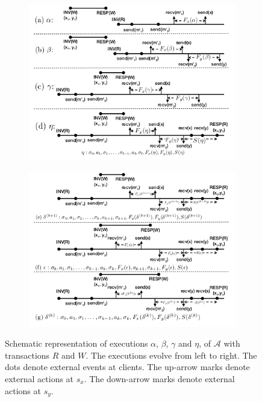 \begin{figure}[t]
	\hspace*{-0.7cm}
	\begin{subfigure}{0.49\textwidth}
		\centering
	\includegraphics[width=1.2\linewidth]{figures/fig4.png}
	\end{subfigure}
	\hspace*{0.0m}  
	\begin{subfigure}{0.49\textwidth}
		\centering
	\includegraphics[width=1.2\linewidth]{figures/fig5.png}
	\end{subfigure} 
	         \caption{
	         	\small{Schematic representation of executions $\alpha$, $\beta$, $\gamma$ and $\eta$,
	         		of ${\mathcal A}$ with transactions $R$ and $W$. The executions evolve from left to right. 
	         		The dots denote external events at clients. 
	         		The up-arrow marks denote external actions at $s_x$. The down-arrow marks denote external actions at $s_y$.}} \label{fig:execution1}
\end{figure}



